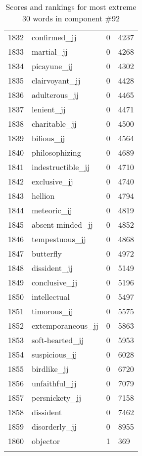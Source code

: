 \begin{longtable}[!htbp]{| rlr@{.}l |}
    1832 & confirmed\_jj & 0 & 4237 \\
    1833 & martial\_jj & 0 & 4268 \\
    1834 & picayune\_jj & 0 & 4302 \\
    1835 & clairvoyant\_jj & 0 & 4428 \\
    1836 & adulterous\_jj & 0 & 4465 \\
    1837 & lenient\_jj & 0 & 4471 \\
    1838 & charitable\_jj & 0 & 4500 \\
    1839 & bilious\_jj & 0 & 4564 \\
    1840 & philosophizing & 0 & 4689 \\
    1841 & indestructible\_jj & 0 & 4710 \\
    1842 & exclusive\_jj & 0 & 4740 \\
    1843 & hellion & 0 & 4794 \\
    1844 & meteoric\_jj & 0 & 4819 \\
    1845 & absent-minded\_jj & 0 & 4852 \\
    1846 & tempestuous\_jj & 0 & 4868 \\
    1847 & butterfly & 0 & 4972 \\
    1848 & dissident\_jj & 0 & 5149 \\
    1849 & conclusive\_jj & 0 & 5196 \\
    1850 & intellectual & 0 & 5497 \\
    1851 & timorous\_jj & 0 & 5575 \\
    1852 & extemporaneous\_jj & 0 & 5863 \\
    1853 & soft-hearted\_jj & 0 & 5953 \\
    1854 & suspicious\_jj & 0 & 6028 \\
    1855 & birdlike\_jj & 0 & 6720 \\
    1856 & unfaithful\_jj & 0 & 7079 \\
    1857 & persnickety\_jj & 0 & 7158 \\
    1858 & dissident & 0 & 7462 \\
    1859 & disorderly\_jj & 0 & 8955 \\
    1860 & objector & 1 & 369 \\
    \hline
    \caption{Scores and rankings for most extreme 30 words in component \#92} \\
\end{longtable}
